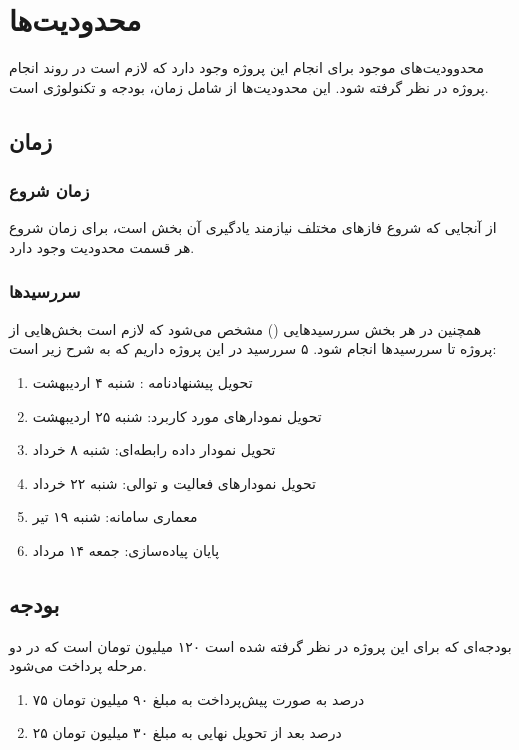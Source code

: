 \chapter{محدودیت‌ها}
محدوودیت‌های موجود برای انجام این پروژه وجود دارد که لازم است در روند انجام پروژه در نظر گرفته شود. این محدودیت‌ها از شامل زمان، بودجه و تکنولوژی است.
\section{زمان}
\subsection{زمان شروع}
از آنجایی که شروع فاز‌های مختلف نیاز‌مند یادگیری آن بخش است، برای زمان شروع هر قسمت محدودیت وجود دارد.
\subsection{سررسیدها}
همچنین در هر بخش سررسید‌هایی
()
مشخص می‌شود که لازم است بخش‌هایی از پروژه تا سررسید‌ها انجام شود. 
۵ سررسید در این پروژه داریم که به شرح زیر است:
\begin{enumerate}
	\item 
	تحویل پیشنهادنامه : شنبه ۴ اردیبهشت
	\item 
	تحویل نمودارهای مورد کاربرد: شنبه ۲۵ اردیبهشت
	\item 
	تحویل نمودار داده رابطه‌ای: شنبه ۸ خرداد
	\item
	تحویل نمودارهای فعالیت و توالی: شنبه ۲۲ خرداد
	\item
	معماری سامانه: شنبه ۱۹ تیر
	\item
	پایان پیاده‌سازی: جمعه  ۱۴ مرداد
\end{enumerate}

\section{بودجه}
بودجه‌ای که برای این پروژه در نظر گرفته شده است ۱۲۰ میلیون تومان است که در دو مرحله پرداخت می‌شود.
\begin{enumerate}
	\item 
	۷۵ درصد به صورت پیش‌پرداخت به مبلغ ۹۰ میلیون تومان
	\item 
	۲۵ درصد بعد از تحویل نهایی به مبلغ ۳۰ میلیون تومان
\end{enumerate}

